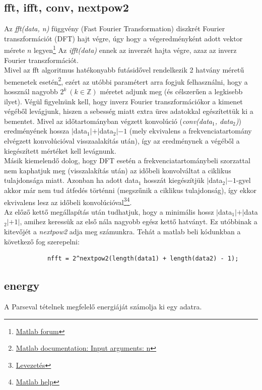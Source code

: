 \documentclass{article}
\begin{document}
	\subsection*{fft, ifft, conv, nextpow2}\label{section:conv}
		Az \textit{fft(data, n)} függvény (Fast Fourier Transformation) diszkrét Fourier transzformációt (DFT) hajt végre, úgy hogy a végeredményként adott vektor mérete $n$ legyen\footnote{\href{https://www.mathworks.com/help/matlab/ref/fft.html\#d123e413321}{Matlab forum}} Az \textit{ifft(data)} ennek az inverzét hajta végre, azaz az inverz Fourier transzformációt.\\
		Mivel az fft algoritmus hatékonyabb futásidővel rendelkezik 2 hatvány méretű bemenetek esetén\footnote{\href{https://www.mathworks.com/help/matlab/ref/fft.html\#expand_panel_heading_f83-998360-n}{Matlab documentation: Input arguments: n}}, ezért az utóbbi paramétert arra fogjuk felhasználni, hogy a hossznál nagyobb $2^k\ (k \in \mathbb{Z})$ méretet adjunk meg (és célszerűen a legkisebb ilyet). Végül figyelnünk kell, hogy inverz Fourier transzformációkor a kimenet végéből levágjunk, hiszen a sebesség miatt extra üres adatokkal egészítettük ki a bementet. Mivel az időtartományban végzett konvolúció (\textit{conv(data$_1$, data$_2$)}) eredményének hossza $|$data$_1| + |$data$_2| - 1$ (mely ekvivalens a frekvenciatartomány elvégzett konvolúcióval visszaalakítás után), így az eredménynek a végéből a kiegészített mértéket kell levágnunk.\\
		Másik kiemelendő dolog, hogy DFT esetén a frekvenciatartománybeli szorzattal nem kaphatjuk meg (visszalakítás után) az időbeli konvolváltat a ciklikus tulajdonsága miatt. Azonban ha adott data$_1$ hosszát kiegészítjük $|$data$_2| - 1$-gyel akkor már nem tud átfedés történni (megszűnik a ciklikus tulajdonság), így ekkor ekvivalens lesz az időbeli konvolúcióval\footnote{\href{https://www.youtube.com/watch?v=eOvMUtMoQG8}{Levezetés}}\footnote{\href{https://www.mathworks.com/help/signal/ug/linear-and-circular-convolution.html}{Matlab help}}. \\
		Az előző kettő megállapítás után tudhatjuk, hogy a minimális hossz $|$data$_1| + |$data$_2| + 1|$, amihez keressük az első nála nagyobb egész kettő hatványt. Ez utóbbinak a kitevőjét a \textit{nextpow2} adja meg számunkra. Tehát a matlab beli kódunkban a következő fog szerepelni:
		\begin{lstlisting}
			nfft = 2^nextpow2(length(data1) + length(data2) - 1);
		\end{lstlisting}
	\subsection*{energy}
		A Parseval tételnek megfelelő energiáját számolja ki egy adatra.
		
\end{document}
